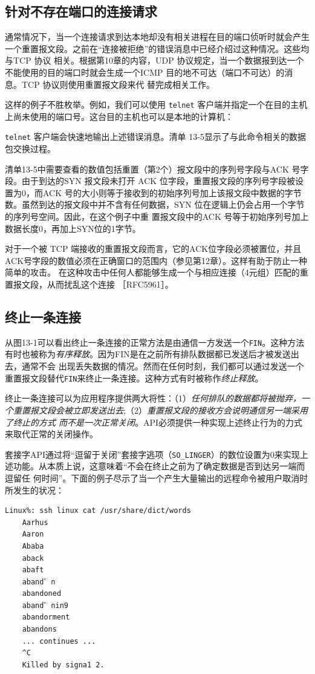 \subsection{针对不存在端口的连接请求}
通常情况下，当一个连接请求到达本地却没有相关进程在目的端口侦听时就会产生一个重置报文段。之前在“连接被拒绝”的错误消息中已经介绍过这种情况。这些均与TCP 协议
相关。根据第10章的内容，UDP 协议规定，当一个数据报到达一个不能使用的目的端口时就会生成一个ICMP 目的地不可达（端口不可达）的消息。TCP 协议则使用重置报文段来代
替完成相关工作。

这样的例子不胜枚举。例如，我们可以使用 \verb|telnet| 客户端并指定一个在目的主机上尚未使用的端口号。这台目的主机也可以是本地的计算机：

\verb|telnet| 客户端会快速地输出上述错误消息。清单 13-5显示了与此命令相关的数据包交换过程。

清单13-5中需要查看的数值包括重置（第2个）报文段中的序列号字段与ACK 号字段。由于到达的SYN 报文段未打开 ACK 位字段，重置报文段的序列号字段被设置为0，而ACK
号的大小则等于接收到的初始序列号加上该报文段中数据的字节数。虽然到达的报文段中并不含有任何数据，SYN 位在逻辑上仍会占用一个字节的序列号空间。因此，在这个例子中重
置报文段中的ACK 号等于初始序列号加上数据长度0，再加上SYN位的1字节。

对于一个被 TCP 端接收的重置报文段而言，它的ACK位字段必须被置位，并且 ACK号字段的数值必须在正确窗口的范围内（参见第12章）。这样有助于防止一种简单的攻击。
在这种攻击中任何人都能够生成一个与相应连接（4元组）匹配的重置报文段，从而扰乱这个连接 ［RFC5961］。
\subsection{终止一条连接}
从图13-1可以看出终止一条连接的正常方法是由通信一方发送一个\verb|FIN|。这种方法有时也被称为\emph{\color{purple}有序释放}。因为FIN是在之前所有排队数据都已发送后才被发送出去，通常不会
出现丢失数据的情况。然而在任何时刻，我们都可以通过发送一个重置报文段替代\verb|FIN|来终止一条连接。这种方式有时被称作\emph{\color{purple}终止释放}。

终止一条连接可以为应用程序提供两大将性：（1）\emph{任何排队的数据都将被抛弃，一个重置报文段会被立即发送出去};（2）\emph{重置报文段的接收方会说明通信另一端采用了终止的方式
而不是一次正常关闭}。API必须提供一种实现上述终止行为的力式来取代正常的关闭操作。

套接字API通过将“逗留于关闭”套接字逃项（\verb|SO_LINGER|）的数位设置为0来实现上述功能。从本质上说，这意味着“不会在终止之前为了确定数据是否到达另一端而逗留任
何时间”。下面的例子尽示了当一个产生大量输出的远程命令被用户取消时所发生的状况：
\begin{lstlisting}[language=bash, caption=Hello world program., label=listing:hello_world]
	Linux%: ssh linux cat /usr/share/dict/words
	Aarhus
	Aaron
	Ababa
	aback
	abaft
	aband゜n
	abandoned
	aband゜nin9
	abandorment
	abandons
	... continues ...
	^C
	Killed by signa1 2.
\end{lstlisting}


